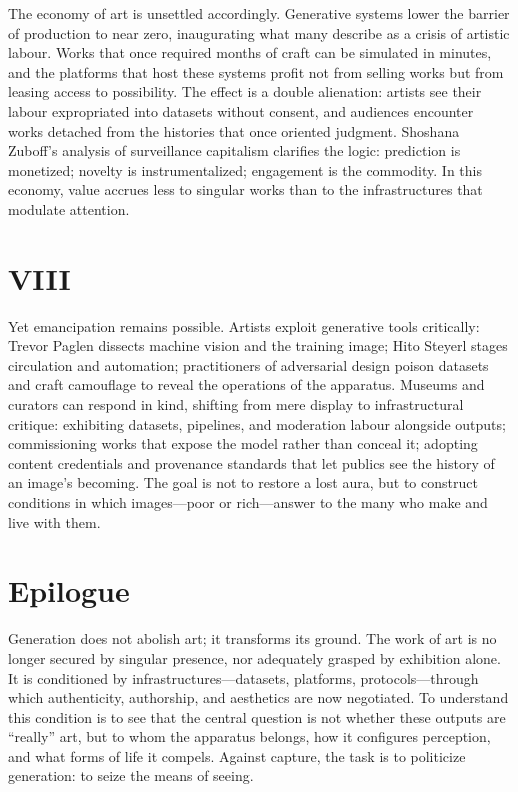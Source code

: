 \documentclass[12pt]{article}
\begin{document}
The economy of art is unsettled accordingly. Generative systems lower the barrier of production to near zero, inaugurating what many describe as a crisis of artistic labour. Works that once required months of craft can be simulated in minutes, and the platforms that host these systems profit not from selling works but from leasing access to possibility. The effect is a double alienation: artists see their labour expropriated into datasets without consent, and audiences encounter works detached from the histories that once oriented judgment. Shoshana Zuboff’s analysis of surveillance capitalism clarifies the logic: prediction is monetized; novelty is instrumentalized; engagement is the commodity.\autocite{Zuboff2019} In this economy, value accrues less to singular works than to the infrastructures that modulate attention.

\section*{VIII}

Yet emancipation remains possible. Artists exploit generative tools critically: Trevor Paglen dissects machine vision and the training image; Hito Steyerl stages circulation and automation; practitioners of adversarial design poison datasets and craft camouflage to reveal the operations of the apparatus.\autocite{Paglen2016,Harvey2022} Museums and curators can respond in kind, shifting from mere display to infrastructural critique: exhibiting datasets, pipelines, and moderation labour alongside outputs; commissioning works that expose the model rather than conceal it; adopting content credentials and provenance standards that let publics see the history of an image’s becoming. The goal is not to restore a lost aura, but to construct conditions in which images—poor or rich—answer to the many who make and live with them.

\section*{Epilogue}

Generation does not abolish art; it transforms its ground. The work of art is no longer secured by singular presence, nor adequately grasped by exhibition alone. It is conditioned by infrastructures—datasets, platforms, protocols—through which authenticity, authorship, and aesthetics are now negotiated. To understand this condition is to see that the central question is not whether these outputs are “really” art, but to whom the apparatus belongs, how it configures perception, and what forms of life it compels. Against capture, the task is to politicize generation: to seize the means of seeing.

\printbibliography
\end{document}
